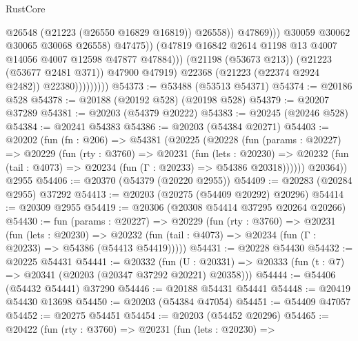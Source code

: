 \begin{lexlean}{RustCore}
\begin{coremodule}
                                            @26548
                                            (@21223 (@26550 @16829 @16819))
                                            @26558))
                                        @47869)))
                                  @30059
                                  @30062
                                  @30065
                                  @30068
                                  @26558)
                                @47475))
                            (@47819
                              @16842
                              @2614
                              @1198
                              @13
                              @4007
                              @14056
                              @4007
                              @12598
                              @47877
                              @47884)))
                        (@21198 (@53673 @213))
                        (@21223 (@53677 @2481 @371))
                        @47900
                        @47919)
                      @22368
                      (@21223 (@22374 @2924 @2482))
                      @22380)))))))))
@54373 := @53488 (@53513 @54371)
@54374 := @20186 @528
@54378 := @20188 (@20192 @528) (@20198 @528)
@54379 := @20207 @37289
@54381 := @20203 (@54379 @20222)
@54383 := @20245 (@20246 @528)
@54384 := @20241 @54383
@54386 := @20203 (@54384 @20271)
@54403 := @20202
    (fun (fn : @206) =>
    @54381
      (@20225
        (@20228
          (fun (params : @20227) =>
          @20229
            (fun (rty : @3760) =>
            @20231
              (fun (lets : @20230) =>
              @20232 (fun (tail : @4073) => @20234 (fun (Γ : @20233) => @54386 @20318))))))
        @20364))
    @2955
@54406 := @20370 (@54379 (@20220 @2955))
@54409 := @20283 (@20284 @2955) @37292
@54413 := @20203 (@20275 (@54409 @20292) @20296)
@54414 := @20309 @2955
@54419 := @20306 (@20308 @54414 @37295 @20264 @20266)
@54430 := fun (params : @20227) =>
  @20229
    (fun (rty : @3760) =>
    @20231
      (fun (lets : @20230) =>
      @20232 (fun (tail : @4073) => @20234 (fun (Γ : @20233) => @54386 (@54413 @54419)))))
@54431 := @20228 @54430
@54432 := @20225 @54431
@54441 := @20332
    (fun (U : @20331) => @20333 (fun (t : @7) => @20341 (@20203 (@20347 @37292 @20221) @20358)))
@54444 := @54406 (@54432 @54441) @37290
@54446 := @20188 @54431 @54441
@54448 := @20419 @54430 @13698
@54450 := @20203 (@54384 @47054)
@54451 := @54409 @47057
@54452 := @20275 @54451
@54454 := @20203 (@54452 @20296)
@54465 := @20422
    (fun (rty : @3760) =>
    @20231
      (fun (lets : @20230) =>

\end{coremodule}
\end{lexlean}
